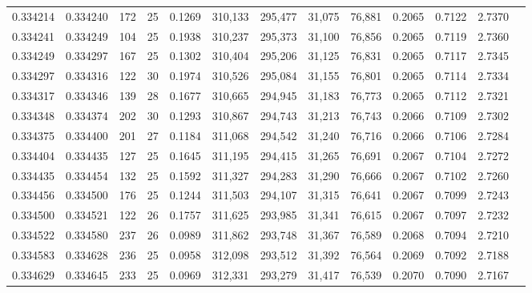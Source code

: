 \begin{tabular}{rrrrrrrrrrrrr}
0.334214 & 0.334240 &   172 &  25 &                                     0.1269 & 310,133 & 295,477 &  31,075 &  76,881 & 0.2065 & 0.7122 & 2.7370 \\
0.334241 & 0.334249 &   104 &  25 &                                     0.1938 & 310,237 & 295,373 &  31,100 &  76,856 & 0.2065 & 0.7119 & 2.7360 \\
0.334249 & 0.334297 &   167 &  25 &                                     0.1302 & 310,404 & 295,206 &  31,125 &  76,831 & 0.2065 & 0.7117 & 2.7345 \\
0.334297 & 0.334316 &   122 &  30 &                                     0.1974 & 310,526 & 295,084 &  31,155 &  76,801 & 0.2065 & 0.7114 & 2.7334 \\
0.334317 & 0.334346 &   139 &  28 &                                     0.1677 & 310,665 & 294,945 &  31,183 &  76,773 & 0.2065 & 0.7112 & 2.7321 \\
0.334348 & 0.334374 &   202 &  30 &                                     0.1293 & 310,867 & 294,743 &  31,213 &  76,743 & 0.2066 & 0.7109 & 2.7302 \\
0.334375 & 0.334400 &   201 &  27 &                                     0.1184 & 311,068 & 294,542 &  31,240 &  76,716 & 0.2066 & 0.7106 & 2.7284 \\
0.334404 & 0.334435 &   127 &  25 &                                     0.1645 & 311,195 & 294,415 &  31,265 &  76,691 & 0.2067 & 0.7104 & 2.7272 \\
0.334435 & 0.334454 &   132 &  25 &                                     0.1592 & 311,327 & 294,283 &  31,290 &  76,666 & 0.2067 & 0.7102 & 2.7260 \\
0.334456 & 0.334500 &   176 &  25 &                                     0.1244 & 311,503 & 294,107 &  31,315 &  76,641 & 0.2067 & 0.7099 & 2.7243 \\
0.334500 & 0.334521 &   122 &  26 &                                     0.1757 & 311,625 & 293,985 &  31,341 &  76,615 & 0.2067 & 0.7097 & 2.7232 \\
0.334522 & 0.334580 &   237 &  26 &                                     0.0989 & 311,862 & 293,748 &  31,367 &  76,589 & 0.2068 & 0.7094 & 2.7210 \\
0.334583 & 0.334628 &   236 &  25 &                                     0.0958 & 312,098 & 293,512 &  31,392 &  76,564 & 0.2069 & 0.7092 & 2.7188 \\
0.334629 & 0.334645 &   233 &  25 &                                     0.0969 & 312,331 & 293,279 &  31,417 &  76,539 & 0.2070 & 0.7090 & 2.7167 \\

\end{tabular}
